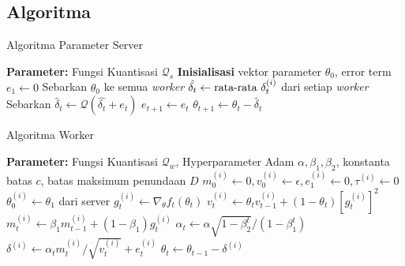 \documentclass[aspectratio=169]{beamer}
\begin{document}
\subsection{Algoritma}
\begin{frame}{Algoritma Parameter Server}
  \begin{algorithm}[H]
    \caption{Algoritma Parameter Server}
    \begin{algorithmic}[1]
      \State \textbf{Parameter:} Fungsi Kuantisasi $\mathcal{Q}_s$
      \State \textbf{Inisialisasi} vektor parameter $\theta_0$, error term $e_1 \gets 0$
      \State Sebarkan $\theta_0$ ke semua \textit{worker}
      \State $\hat{\delta_t} \gets \textnormal{rata-rata } \delta_t^{(i)}$ dari setiap \textit{worker}
      \State Sebarkan $\tilde{\delta_t} \gets \mathcal{Q}(\hat{\delta_t} + e_t)$
      \State $e_{t+1} \gets e_{t}$
      \State $\theta_{t+1} \gets \theta_t - \tilde{\delta_t}$
      \EndFor
    \end{algorithmic}
  \end{algorithm}
\end{frame}

\begin{frame}{Algoritma Worker}
  \begin{algorithm}[H]
    \caption{Modifikasi Adam untuk Worker ke-$i$}
    \begin{algorithmic}[1]
      \State \textbf{Parameter:} Fungsi Kuantisasi $\mathcal{Q}_w$, Hyperparameter Adam $\alpha, \beta_1, \beta_2$, konstanta batas $c$, batas maksimum penundaan $D$
      \State $m_0^{(i)} \gets 0, v_0^{(i)} \gets \epsilon, e_1^{(i)} \gets 0, \tau^{(i)} \gets 0$
      \State $\theta^{(i)}_0 \gets \theta_1$ dari server
      \State $g_t^{(i)} \gets \nabla_\theta f_t(\theta_{t})$
      \State $v_t^{(i)} \gets \theta_t v_{t-1}^{(i)} + (1-\theta_t)[g_t^{(i)}]^2$
      \State $m_t^{(i)} \gets \beta_1 m_{t-1}^{(i)} + (1-\beta_1)g_t^{(i)}$
      \State $\alpha_t \gets \alpha \sqrt{1-\beta_2^t}/(1-\beta_1^t)$
      \State $\delta^{(i)} \gets \alpha_t m_t^{(i)}/\sqrt{v_t^{(i)}}+e_t^{(i)}$
      \State $\theta_t \gets \theta_{t-1} - \delta^{(i)}$
    \end{algorithmic}
  \end{algorithm}
\end{frame}
\end{document}

